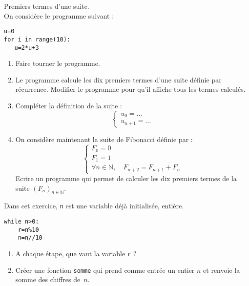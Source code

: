 \begin{exercice}Premiers termes d'une suite.\\
On considère le programme suivant :
\begin{verbatim}
u=0
for i in range(10):
   u=2*u+3
\end{verbatim}
\begin{enumerate}
\item Faire tourner le programme.
\item Le programme calcule les dix premiers termes d'une suite définie par récurrence. Modifier le programme pour qu'il affiche tous les termes calculés.
\item Compléter la définition de la suite :
\[\left\lbrace\begin{array}{l}
u_0=...\\
u_{n+1}=...
\end{array}\right.\]
\item On considère maintenant la suite de Fibonacci définie par :
\[\left\lbrace\begin{array}{l}
F_0=0\\
F_1=1\\
\forall n\in\mathbb{N}, \quad F_{n+2}=F_{n+1}+F_n
\end{array}\right.\]
Ecrire un programme qui permet de calculer les dix premiers termes de la suite $(F_n)_{n\in\mathbb{N}}$. 
\end{enumerate}
\end{exercice}
\bigskip



\begin{exercice}
Dans cet exercice, \verb?n? est une variable déjà initialisée, entière.
\begin{verbatim}
while n>0:
    r=n%10
    n=n//10 
\end{verbatim}
\begin{enumerate}
\item A chaque étape, que vaut la variable \verb?r? ?
\item Créer une fonction \verb?somme? qui prend comme entrée un entier $n$ et renvoie la somme des chiffres de~$n$.
\end{enumerate}
\end{exercice}
\bigskip





